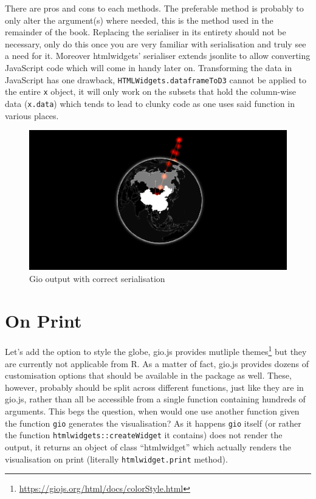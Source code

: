 \documentclass[
]{krantz}
\renewcommand{\href}[2]{#2\footnote{\url{#1}}}
\begin{document}
There are pros and cons to each methods. The preferable method is probably to only alter the argument(s) where needed, this is the method used in the remainder of the book. Replacing the serialiser in its entirety should not be necessary, only do this once you are very familiar with serialisation and truly see a need for it. Moreover htmlwidgets' serialiser extends jsonlite to allow converting JavaScript code which will come in handy later on. Transforming the data in JavaScript has one drawback, \texttt{HTMLWidgets.dataframeToD3} cannot be applied to the entire \texttt{x} object, it will only work on the subsets that hold the column-wise data (\texttt{x.data}) which tends to lead to clunky code as one uses said function in various places.

\begin{figure}
\centering
\includegraphics{images/gio-data.png}
\caption{Gio output with correct serialisation}
\end{figure}

\hypertarget{on-print}{%
\section*{On Print}\label{on-print}}


Let's add the option to style the globe, gio.js provides mutliple \href{https://giojs.org/html/docs/colorStyle.html}{themes} but they are currently not applicable from R. As a matter of fact, gio.js provides dozens of customisation options that should be available in the package as well. These, however, probably should be split across different functions, just like they are in gio.js, rather than all be accessible from a single function containing hundreds of arguments. This begs the question, when would one use another function given the function \texttt{gio} generates the visualisation? As it happens \texttt{gio} itself (or rather the function \texttt{htmlwidgets::createWidget} it contains) does not render the output, it returns an object of class ``htmlwidget'' which actually renders the visualisation on print (literally \texttt{htmlwidget.print} method).
\end{document}
